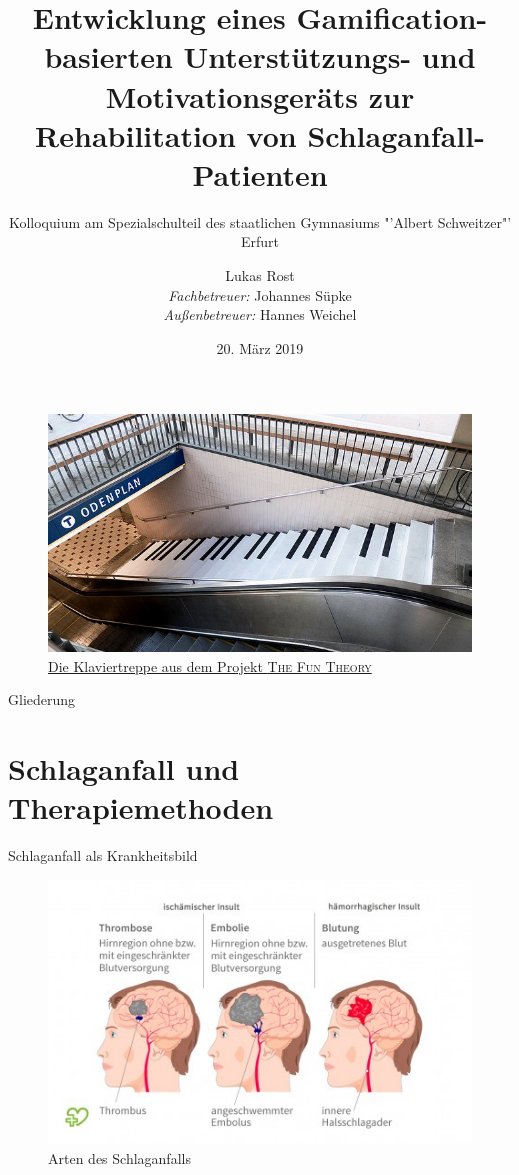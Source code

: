 \documentclass[hyphens]{beamer}
\begin{document}
  \title[Gerät zur Schlaganfall-Rehabilitation]{\LARGE{Entwicklung eines Gamification-basierten Unterstützungs- und Motivationsgeräts zur Rehabilitation von Schlaganfall-Patienten}}
  \subtitle{Kolloquium am Spezialschulteil des staatlichen Gymnasiums "'Albert Schweitzer"' Erfurt}
  \author[Lukas Rost]{Lukas Rost \\ \emph{Fachbetreuer:} Johannes Süpke \\ \emph{Außenbetreuer:} Hannes Weichel}
  \date{20. März 2019}


 \titlepage
 
 \begin{frame}
 \begin{figure}
 	\includegraphics[scale=0.5]{pics/pianostairs}
 	\caption{\href{https://www.youtube.com/watch?v=SByymar3bds}{Die Klaviertreppe aus dem Projekt \textsc{The Fun Theory}}}
 \end{figure}
\end{frame}

 
 \titlepage

 \begin{frame}{Gliederung}
 \tableofcontents
 \end{frame}

\section{Schlaganfall und Therapiemethoden}

\begin{frame}{Schlaganfall als Krankheitsbild}
\begin{figure}
	\includegraphics[scale=0.6]{pics/sentst}
	\caption{Arten des Schlaganfalls}
\end{figure}
\end{frame}
\end{document}
